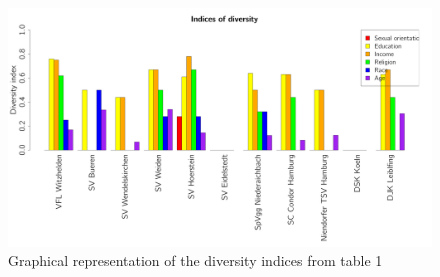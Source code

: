 \documentclass[	
	12pt, %
	a4paper, %
]{scrartcl}\usepackage[]{graphicx}\usepackage[]{color}
\newenvironment{knitrout}{}{} %
\begin{document}
\begin{knitrout}\footnotesize
{}\color{fgcolor}\begin{figure}[]


{\centering \includegraphics[width=1\linewidth]{figure/beamer-indices} 

}

\caption[Graphical representation of the diversity indices from table 1]{Graphical representation of the diversity indices from table 1\label{fig:indices}}
\end{figure}


\end{knitrout}



\clearpage
\end{document}
